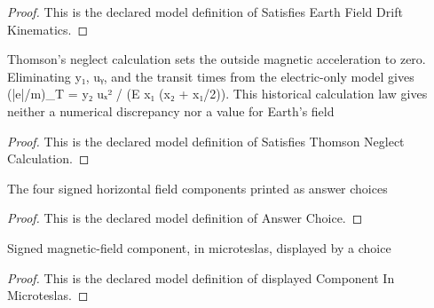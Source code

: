 \begin{proof}
  This is the declared model definition of Satisfies Earth Field Drift Kinematics.
\end{proof}
\begin{definition}
  \label{def:physics:phyx-mini-0561:phyxminiproblems-problemphyxmini0561-satisfiesthomsonneglectcalculation}
  Thomson's neglect calculation sets the outside magnetic acceleration to zero. Eliminating y₁, uᵧ, and the transit times from the electric-only model gives (|e|/m)\_T = y₂ uₓ² / (E x₁ (x₂ + x₁/2)). This historical calculation law gives neither a numerical discrepancy nor a value for Earth's field
\end{definition}
\begin{proof}
  This is the declared model definition of Satisfies Thomson Neglect Calculation.
\end{proof}
\begin{definition}
  \label{def:physics:phyx-mini-0561:phyxminiproblems-problemphyxmini0561-answerchoice}
  The four signed horizontal field components printed as answer choices
\end{definition}
\begin{proof}
  This is the declared model definition of Answer Choice.
\end{proof}
\begin{definition}
  \label{def:physics:phyx-mini-0561:phyxminiproblems-problemphyxmini0561-displayedcomponentinmicroteslas}
  Signed magnetic-field component, in microteslas, displayed by a choice
\end{definition}
\begin{proof}
  This is the declared model definition of displayed Component In Microteslas.
\end{proof}
